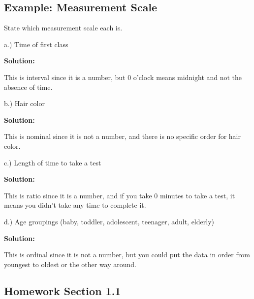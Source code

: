 \documentclass[
]{book}
\begin{document}
\hypertarget{example-measurement-scale}{%
\subsection{Example: Measurement Scale}\label{example-measurement-scale}}

State which measurement scale each is.

a.) Time of first class

\textbf{Solution:}

This is interval since it is a number, but 0 o'clock means midnight and not the absence of time.

b.) Hair color

\textbf{Solution:}

This is nominal since it is not a number, and there is no specific order for hair color.

c.) Length of time to take a test

\textbf{Solution:}

This is ratio since it is a number, and if you take 0 minutes to take a test, it means you didn't take any time to complete it.

d.) Age groupings (baby, toddler, adolescent, teenager, adult, elderly)

\textbf{Solution:}

This is ordinal since it is not a number, but you could put the data in order from youngest to oldest or the other way around.

\hypertarget{homework-section-1.1}{%
\subsection{Homework Section 1.1}\label{homework-section-1.1}}
\end{document}
